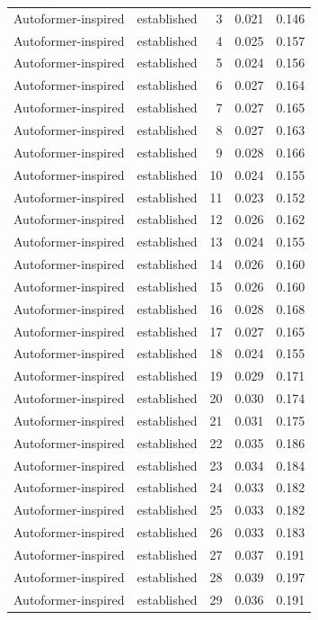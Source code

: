 \begin{tabular}{llrrr}
Autoformer-inspired & established & 3 & 0.021 & 0.146 \\
Autoformer-inspired & established & 4 & 0.025 & 0.157 \\
Autoformer-inspired & established & 5 & 0.024 & 0.156 \\
Autoformer-inspired & established & 6 & 0.027 & 0.164 \\
Autoformer-inspired & established & 7 & 0.027 & 0.165 \\
Autoformer-inspired & established & 8 & 0.027 & 0.163 \\
Autoformer-inspired & established & 9 & 0.028 & 0.166 \\
Autoformer-inspired & established & 10 & 0.024 & 0.155 \\
Autoformer-inspired & established & 11 & 0.023 & 0.152 \\
Autoformer-inspired & established & 12 & 0.026 & 0.162 \\
Autoformer-inspired & established & 13 & 0.024 & 0.155 \\
Autoformer-inspired & established & 14 & 0.026 & 0.160 \\
Autoformer-inspired & established & 15 & 0.026 & 0.160 \\
Autoformer-inspired & established & 16 & 0.028 & 0.168 \\
Autoformer-inspired & established & 17 & 0.027 & 0.165 \\
Autoformer-inspired & established & 18 & 0.024 & 0.155 \\
Autoformer-inspired & established & 19 & 0.029 & 0.171 \\
Autoformer-inspired & established & 20 & 0.030 & 0.174 \\
Autoformer-inspired & established & 21 & 0.031 & 0.175 \\
Autoformer-inspired & established & 22 & 0.035 & 0.186 \\
Autoformer-inspired & established & 23 & 0.034 & 0.184 \\
Autoformer-inspired & established & 24 & 0.033 & 0.182 \\
Autoformer-inspired & established & 25 & 0.033 & 0.182 \\
Autoformer-inspired & established & 26 & 0.033 & 0.183 \\
Autoformer-inspired & established & 27 & 0.037 & 0.191 \\
Autoformer-inspired & established & 28 & 0.039 & 0.197 \\
Autoformer-inspired & established & 29 & 0.036 & 0.191 \\

\end{tabular}
